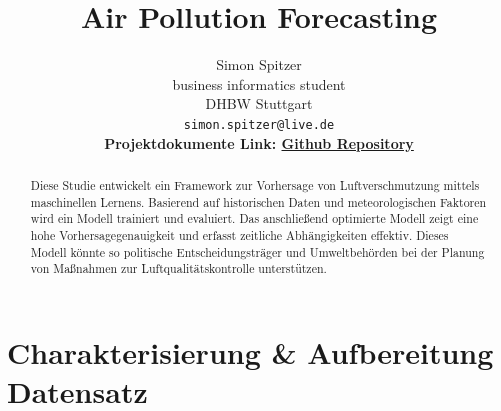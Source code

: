 \documentclass{article}
\title{Air Pollution Forecasting}
\author{
  Simon Spitzer \\
  business informatics student \\
  DHBW Stuttgart \\
  \texttt{simon.spitzer@live.de} \\
  \textbf{Projektdokumente Link: \href{https://github.com/Tzimon/Machine_Learning_Project_Semester_6}{Github Repository}}
}
\begin{document}
\maketitle


\begin{abstract}
  Diese Studie entwickelt ein Framework zur Vorhersage von Luftverschmutzung mittels maschinellen Lernens.
  Basierend auf historischen Daten und meteorologischen Faktoren wird ein Modell trainiert und evaluiert.
  Das anschließend optimierte Modell zeigt eine hohe Vorhersagegenauigkeit und erfasst zeitliche Abhängigkeiten effektiv.
  Dieses Modell könnte so politische Entscheidungsträger und Umweltbehörden bei der Planung von Maßnahmen zur Luftqualitätskontrolle unterstützen.
\end{abstract}





\section{Charakterisierung \& Aufbereitung Datensatz}
\end{document}
